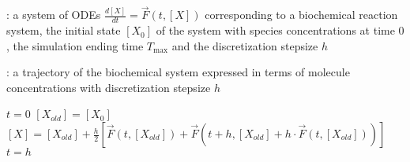 
\begin{algorithm}[H]
\DontPrintSemicolon
{}

\caption{\protect\TitleFunction{}}
\label{algo:midpoint}

\Input: a system of ODEs $\frac{d[X]}{dt} = \vec{F}(t, [X])$ corresponding to a biochemical reaction system, the initial state $[X_0]$ of the system with species concentrations at time $0$, the simulation ending time $T_{\max}$ and the discretization stepsize $h$\;

\Output: a trajectory of the biochemical system expressed in terms of molecule concentrations with discretization stepsize $h$\;

$t = 0$\;
$[X_{old}] = [X_0]$\;
$[X] = [X_{old}] + \frac{h}{2}\left[\vec{F}(t,[X_{old}]) + \vec{F}(t+h, [X_{old}] + h\cdot\vec{F}(t, [X_{old}]))\right]$\;
$t = h$\;


\end{algorithm}
